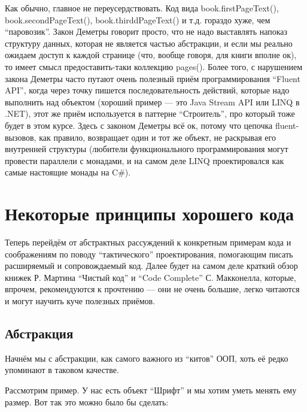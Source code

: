 \documentclass{../../text-style}
\begin{document}
Как обычно, главное не переусердствовать. Код вида book.firstPageText(), book.secondPageText(), book.thirddPageText() и т.д. гораздо хуже, чем ``паровозик''. Закон Деметры говорит просто, что не надо выставлять напоказ структуру данных, которая не является частью абстракции, и если мы реально ожидаем доступ к каждой странице (что, вообще говоря, для книги вполне ок), то имеет смысл предоставить-таки коллекцию pages(). Более того, с нарушением закона Деметры часто путают очень полезный приём программирования ``Fluent API'', когда через точку пишется последовательность действий, которые надо выполнить над объектом (хороший пример --- это Java Stream API или LINQ в .NET), этот же приём используется в паттерне ``Строитель'', про который тоже будет в этом курсе. Здесь с законом Деметры всё ок, потому что цепочка fluent-вызовов, как правило, возвращает один и тот же объект, не раскрывая его внутренней структуры (любители функционального программирования могут провести параллели с монадами, и на самом деле LINQ проектировался как самые настоящие монады на C\#).

\section{Некоторые принципы хорошего кода}

Теперь перейдём от абстрактных рассуждений к конкретным примерам кода и соображениям по поводу ``тактического'' проектирования, помогающим писать расширяемый и сопровождаемый код. Далее будет на самом деле краткий обзор книжек Р. Мартина ``Чистый код'' и ``Code Complete'' С. Макконелла, которые, впрочем, рекомендуются к прочтению --- они не очень большие, легко читаются и могут научить куче полезных приёмов.

\subsection{Абстракция}

Начнём мы с абстракции, как самого важного из ``китов'' ООП, хоть её редко упоминают в таковом качестве.

Рассмотрим пример. У нас есть объект ``Шрифт'' и мы хотим уметь менять ему размер. Вот так это можно было бы сделать:
\end{document}
